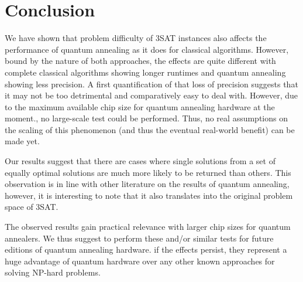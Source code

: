 \section{Conclusion}
\label{sec:conclusion}


We have shown that problem difficulty of 3SAT instances also affects the performance of quantum annealing as it does for classical algorithms. However, bound by the nature of both approaches, the effects are quite different with complete classical algorithms showing longer runtimes and quantum annealing showing less precision. A first quantification of that loss of precision suggests that it may not be too detrimental and comparatively easy to deal with. However, due to the maximum available chip size for quantum annealing hardware at the moment., no large-scale test could be performed. Thus, no real assumptions on the scaling of this phenomenon (and thus the eventual real-world benefit) can be made yet.

Our results suggest that there are cases where single solutions from a set of equally optimal solutions are much more likely to be returned than others. This observation is in line with other literature on the results of quantum annealing, however, it is interesting to note that it also translates into the original problem space of 3SAT.

The observed results gain practical relevance with larger chip sizes for quantum annealers. We thus suggest to perform these and/or similar tests for future editions of quantum annealing hardware. if the effects persist, they represent a huge advantage of quantum hardware over any other known approaches for solving NP-hard problems.
